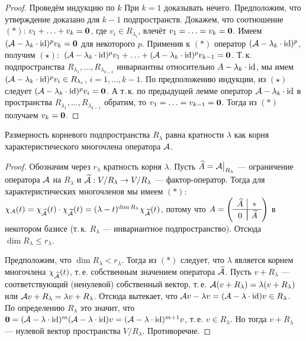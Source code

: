 \begin{proof}
    Проведём индукцию по $k$ При $k = 1$ доказывать нечего. Предположим, что утверждение доказано для $k - 1$ подпространств. Докажем, что соотношение $(\ast)$: $v_1 + \ldots + v_k = \boldsymbol{0}$, где $v_i \in R_{\lambda_i}$, влечёт $v_1 = \ldots = v_k = \boldsymbol{0}$. Имеем $(\mathcal{A} - \lambda_k \cdot \mathrm{id})^pv_k = \boldsymbol{0}$ для некоторого $p$. Применив к $(\ast)$ оператор $(\mathcal{A} - \lambda_k \cdot \mathrm{id})^p$, получим $(\star):$ $(\mathcal{A} - \lambda_k \cdot \mathrm{id})^pv_1 + \ldots + (\mathcal{A} - \lambda_k \cdot \mathrm{id})^pv_{k - 1} = \boldsymbol{0}$. Т.\,к. подпространства $R_{\lambda_1}, \ldots, R_{\lambda_{k - 1}}$ инвариантны относительно $A - \lambda_k \cdot \mathrm{id}$, мы имем $(\mathcal{A} - \lambda_k \cdot \mathrm{id})^pv_i \in R_{\lambda_i}$, $i = 1, \ldots, k - 1$. По предположению индукции, из $(\star)$ следует $(\mathcal{A} - \lambda_k \cdot \mathrm{id})^pv_i = \boldsymbol{0}$. А т.\,к. по предыдущей лемме оператор $\mathcal{A} - \lambda_k \cdot \mathrm{id}$ в пространства $R_{\lambda_1}, \ldots, R_{\lambda_{k - 1}}$ обратим, то $v_1 = \ldots = v_{k - 1} = \boldsymbol{0}$. Тогда из $(\ast)$ получаем $v_k = \boldsymbol{0}$.
\end{proof}

\begin{lemma}
    Размерность корневого подпространства $R_\lambda$ равна кратности $\lambda$ как корня характеристического многочлена оператора $\mathcal{A}$.
\end{lemma}

\begin{proof}
    Обозначим через $r_\lambda$ кратность корня $\lambda$. Пусть $\widehat{A} = \mathcal{A}\big|_{R_\lambda}$ --- ограничение оператора $\mathcal{A}$ на $R_\lambda$ и $\widetilde{\mathcal{A}}: V / R_\lambda \to V / R_\lambda$ --- фактор-оператор. Тогда для характеристических многочленов мы имеем $(\ast):$ $\chi_{\mathcal{A}}(t) = \chi_{\widehat{\mathcal{A}}}(t) \cdot \chi_{\widetilde{\mathcal{A}}}(t) = (\lambda - t)^{\dim R_\lambda}\chi_{\widetilde{\mathcal{A}}}(t)$, потому что
    $
    A =
    \left(
        \begin{array}{c | c}
            \widehat{A} & \ast\\
            \hline\vspace{-4mm}\\
            0 & \widetilde{A}
        \end{array}
    \right)
    $ в некотором базисе (т.\,к. $R_\lambda$ --- инвариантное подпространство). Отсюда $\dim R_\lambda \leqslant r_\lambda$.

    Предположим, что $\dim R_\lambda < r_\lambda$. Тогда из $(\ast)$ следует, что $\lambda$ является корнем многочлена $\chi_{\widetilde{\mathcal{A}}}(t)$, т.\,е. собственным значением оператора $\widetilde{\mathcal{A}}$. Пусть $v + R_\lambda$ --- соответствующий (ненулевой) собственный вектор, т.\,е. $\mathcal{A}(v + R_\lambda) = \lambda(v + R_\lambda)$ или $\mathcal{A} v + R_\lambda = \lambda v + R_\lambda$. Отсюда вытекает, что $\mathcal{A} v - \lambda v = (\mathcal{A} - \lambda \cdot \mathrm{id})v \in R_\lambda$. По определению $R_\lambda$ это значит, что $\boldsymbol{0} = (\mathcal{A} - \lambda \cdot \mathrm{id})^m(\mathcal{A} - \lambda \cdot \mathrm{id})v = (\mathcal{A} - \lambda \cdot \mathrm{id})^{m + 1}v$, т.\,е. $v \in R_\lambda$. Но тогда $v + R_\lambda$ --- нулевой вектор пространства $V / R_\lambda$. Противоречие.
\end{proof}

